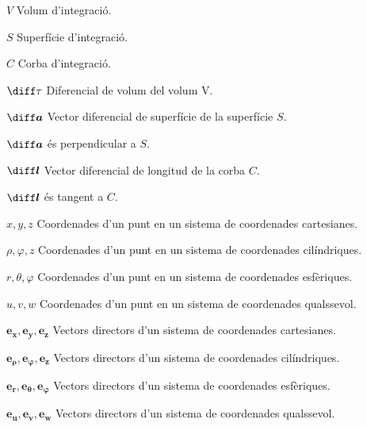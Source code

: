 \documentclass[catalan,a4paper,twoside,11pt]{article}
\begin{document}
\begin{list}{}
{\setlength{\labelwidth}{16mm}
\setlength{\leftmargin}{20mm}\setlength{\labelsep}{4mm}}
   \item[$V$] Volum d'integració.

   \item[$S$] Superfície d'integració.

   \item[$C$] Corba d'integració.

   \item[$\diff\tau$] Diferencial de volum del volum V.

   \item[$\boldsymbol{\diff a}$] Vector diferencial de superfície de la superfície $S$.

   $\boldsymbol{\diff a}$ és perpendicular a $S$.

   \item[$\boldsymbol{\diff l}$] Vector diferencial de longitud de la corba
   $C$.

   $\boldsymbol{\diff l}$ és tangent a $C$.

   \item[$x,y,z$] Coordenades d'un punt en un sistema de coordenades cartesianes.

   \item[$\rho,\varphi,z$] Coordenades d'un punt en un sistema de   coordenades cilíndriques.

   \item[$r,\theta,\varphi$] Coordenades d'un punt en un sistema de   coordenades esfèriques.

   \item[$u,v,w$] Coordenades d'un punt en un sistema de   coordenades qualssevol.
   \item[$\boldsymbol{e_x},\boldsymbol{e_y},\boldsymbol{e_z}$]
   Vectors directors d'un sistema de  coordenades    cartesianes.

   \item[$\boldsymbol{e_\rho},\boldsymbol{e_\varphi},\boldsymbol{e_z}$] Vectors directors d'un sistema de   coordenades cilíndriques.

   \item[$\boldsymbol{e_r},\boldsymbol{e_\theta},\boldsymbol{e_\varphi}$] Vectors directors d'un sistema de   coordenades esfèriques.

   \item[$\boldsymbol{e_u},\boldsymbol{e_v},\boldsymbol{e_w}$]
   Vectors directors d'un sistema de  coordenades   qualssevol.


\end{list}
\end{document}
